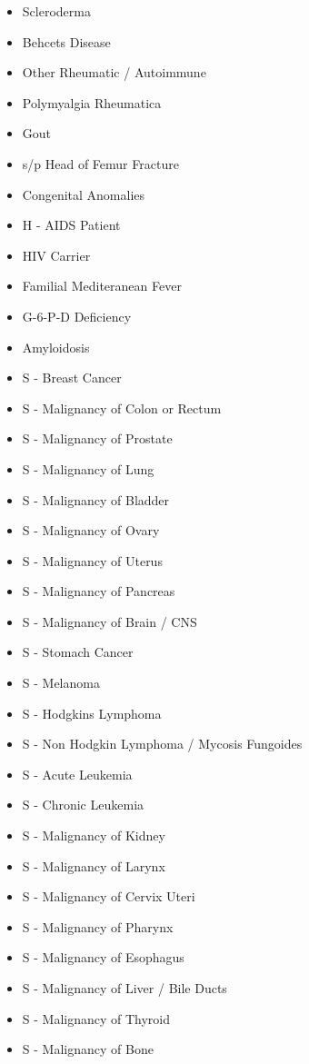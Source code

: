 \documentclass[a4paper,12pt]{article}
\begin{document}
\begin{appendices}
\begin{itemize}
   			\item Scleroderma
   			\item Behcets Disease
   			\item Other Rheumatic / Autoimmune
   			\item Polymyalgia Rheumatica
   			\item Gout
   			\item s/p Head of Femur Fracture
   			\item Congenital Anomalies
   			\item H - AIDS Patient
   			\item HIV Carrier
   			\item Familial Mediteranean Fever
   			\item G-6-P-D Deficiency
   			\item Amyloidosis
   			\item S - Breast Cancer
   			\item S - Malignancy of Colon or Rectum
   			\item S - Malignancy of Prostate
   			\item S - Malignancy of Lung
   			\item S - Malignancy of Bladder
   			\item S - Malignancy of Ovary
   			\item S - Malignancy of Uterus
   			\item S - Malignancy of Pancreas
   			\item S - Malignancy of Brain / CNS
   			\item S - Stomach Cancer
   			\item S - Melanoma
   			\item S - Hodgkins Lymphoma
   			\item S - Non Hodgkin Lymphoma / Mycosis Fungoides
   			\item S - Acute Leukemia
   			\item S - Chronic Leukemia
   			\item S - Malignancy of Kidney
   			\item S - Malignancy of Larynx
   			\item S - Malignancy of Cervix Uteri
   			\item S - Malignancy of Pharynx
   			\item S - Malignancy of Esophagus
   			\item S - Malignancy of Liver / Bile Ducts
   			\item S - Malignancy of Thyroid
   			\item S - Malignancy of Bone

\end{itemize}
\end{appendices}
\end{document}
